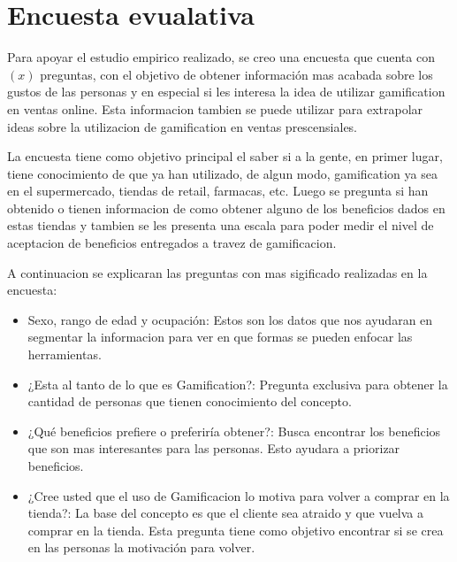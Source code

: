 \section{Encuesta evualativa}

Para apoyar el estudio empirico realizado, se creo una encuesta que cuenta con $(x)$ preguntas, con el
objetivo de obtener información mas acabada sobre los gustos de las personas y en especial
si les interesa la idea de utilizar gamification en ventas online. Esta informacion
tambien se puede utilizar para extrapolar ideas sobre la utilizacion de gamification en
ventas prescensiales.

La encuesta tiene como objetivo principal el saber si a la gente, en primer lugar, tiene conocimiento
de que ya han utilizado, de algun modo, gamification ya sea en el supermercado, tiendas de retail,
farmacas, etc. Luego se pregunta si han obtenido o tienen informacion de como obtener alguno
de los beneficios dados en estas tiendas y tambien se les presenta una escala para poder medir
el nivel de aceptacion de beneficios entregados a travez de gamificacion.

A continuacion se explicaran las preguntas con mas sigificado realizadas en la encuesta:
\begin{itemize}
\item Sexo, rango de edad y ocupación: Estos son los datos que nos ayudaran en segmentar
la informacion para ver en que formas se pueden enfocar las herramientas.
\item ¿Esta al tanto de lo que es Gamification?: Pregunta exclusiva para obtener la cantidad de
personas que tienen conocimiento del concepto.
\item ¿Qué beneficios prefiere o preferiría obtener?: Busca encontrar los beneficios que son
 mas interesantes para las personas. Esto ayudara a priorizar beneficios.
\item ¿Cree usted que el uso de Gamificacion lo motiva para volver a comprar en la tienda?: La
base del concepto es que el cliente sea atraido y que vuelva a comprar en la tienda. Esta pregunta
tiene como objetivo encontrar si se crea en las personas la motivación para volver.
\end{itemize}

